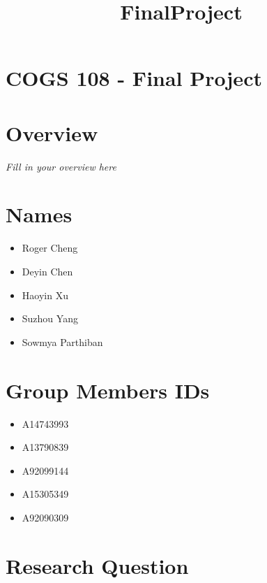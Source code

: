 \documentclass[11pt]{article}
\title{FinalProject}
\providecommand{\tightlist}{%
      \setlength{\itemsep}{0pt}\setlength{\parskip}{0pt}}
\begin{document}
    
    
    \maketitle
    
    

    
    \section{COGS 108 - Final Project}\label{cogs-108---final-project}

    \section{Overview}\label{overview}

    \emph{Fill in your overview here}

    \section{Names}\label{names}

\begin{itemize}
\tightlist
\item
  Roger Cheng
\item
  Deyin Chen
\item
  Haoyin Xu
\item
  Suzhou Yang
\item
  Sowmya Parthiban
\end{itemize}

    \section{Group Members IDs}\label{group-members-ids}

\begin{itemize}
\tightlist
\item
  A14743993
\item
  A13790839
\item
  A92099144
\item
  A15305349
\item
  A92090309
\end{itemize}

    \section{Research Question}\label{research-question}
\end{document}
